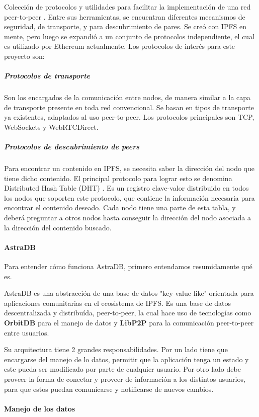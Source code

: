 Colección de protocolos y utilidades para facilitar la implementación de una red peer-to-peer \cite{libp2p}. Entre sus herramientas, se encuentran diferentes mecanismos de seguridad, de transporte, y para descubrimiento de pares. Se creó con IPFS en mente, pero luego se expandió a un conjunto de protocolos independiente, el cual es utilizado por Ethereum actualmente. Los protocolos de interés para este proyecto son:
\subparagraph{Protocolos de transporte} Son los encargados de la comunicación entre nodos, de manera similar a la capa de transporte presente en toda red convencional. Se basan en tipos de transporte ya existentes, adaptados al uso peer-to-peer. Los protocolos principales son TCP, WebSockets y WebRTCDirect.
\subparagraph{Protocolos de descubrimiento de peers} Para encontrar un contenido en IPFS, se necesita saber la dirección del nodo que tiene dicho contenido. El principal protocolo para lograr esto se denomina Distributed Hash Table (DHT) \cite{dht}. Es un registro clave-valor distribuido en todos los nodos que soporten este protocolo, que contiene la información necesaria para encontrar el contenido deseado. Cada nodo tiene una parte de esta tabla, y deberá preguntar a otros nodos hasta conseguir la dirección del nodo asociada a la dirección del contenido buscado.



\paragraph{AstraDB}

Para entender cómo funciona AstraDB, primero entendamos resumidamente qué es.

AstraDB es una abstracción de una base de datos "key-value like" orientada para aplicaciones comunitarias en el ecosistema de IPFS. Es una base de datos descentralizada y distribuída, peer-to-peer, la cual hace uso de tecnologías como \textbf{OrbitDB} \cite{orbitdb} para el manejo de datos y \textbf{LibP2P} \cite{libp2p} para la comunicación peer-to-peer entre usuarios.

Su arquitectura tiene 2 grandes responsabilidades. Por un lado tiene que encargarse del manejo de lo datos, permitir que la aplicación tenga un estado y este pueda ser modificado por parte de cualquier usuario. Por otro lado debe proveer la forma de conectar y proveer de información a los distintos usuarios, para que estos puedan comunicarse y notificarse de nuevos cambios.

\paragraph{Manejo de los datos}


